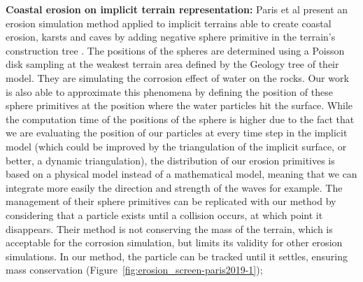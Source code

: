 \textbf{Coastal erosion on implicit terrain representation:}
Paris et al present an erosion simulation method applied to implicit terrains able to create coastal erosion, karsts and caves by adding negative sphere primitive in the terrain's construction tree \cite{Paris2019}. The positions of the spheres are determined using a Poisson disk sampling at the weakest terrain area defined by the Geology tree of their model. They are simulating the corrosion effect of water on the rocks. Our work is also able to approximate this phenomena by defining the position of these sphere primitives at the position where the water particles hit the surface. While the computation time of the positions of the sphere is higher due to the fact that we are evaluating the position of our particles at every time step in the implicit model (which could be improved by the triangulation of the implicit surface, or better, a dynamic triangulation), the distribution of our erosion primitives is based on a physical model instead of a mathematical model, meaning that we can integrate more easily the direction and strength of the waves for example. The management of their sphere primitives can be replicated with our method by considering that a particle exists until a collision occurs, at which point it disappears. Their method is not conserving the mass of the terrain, which is acceptable for the corrosion simulation, but limits its validity for other erosion simulations. In our method, the particle can be tracked until it settles, ensuring mass conservation (Figure~\ref{fig:erosion_screen-paris2019-1});

